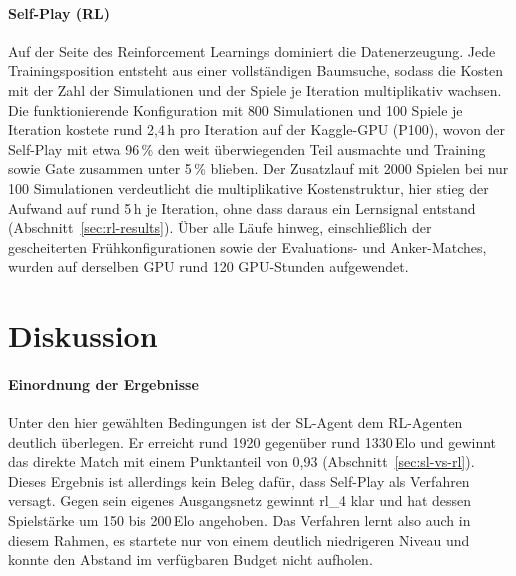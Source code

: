\documentclass[
  a4paper, 12pt,
  parskip=half,
  headings=small,
  bibliography=totoc
]{scrartcl}
\begin{document}
\paragraph{Self-Play (RL)}
Auf der Seite des Reinforcement Learnings dominiert die Datenerzeugung. Jede Trainingsposition entsteht aus einer vollständigen Baumsuche, sodass die Kosten mit der Zahl der Simulationen und der Spiele je Iteration multiplikativ wachsen.
Die funktionierende Konfiguration mit 800 Simulationen und 100 Spiele je Iteration kostete rund 2{,}4\,h pro Iteration auf der Kaggle-GPU (P100), wovon der Self-Play mit etwa 96\,\% den weit überwiegenden Teil ausmachte und Training sowie Gate zusammen unter 5\,\% blieben. 
Der Zusatzlauf mit 2000 Spielen bei nur 100 Simulationen verdeutlicht die multiplikative Kostenstruktur, hier stieg der Aufwand auf rund 5\,h je Iteration, ohne dass daraus ein Lernsignal entstand (Abschnitt~\ref{sec:rl-results}). Über alle Läufe hinweg, einschließlich der gescheiterten Frühkonfigurationen sowie der Evaluations- und Anker-Matches, wurden auf derselben GPU rund 120 GPU-Stunden aufgewendet.


\section{Diskussion}

\paragraph{Einordnung der Ergebnisse}
Unter den hier gewählten Bedingungen ist der SL-Agent dem RL-Agenten deutlich
überlegen. Er erreicht rund 1920 gegenüber rund
1330\,Elo und gewinnt das direkte Match mit einem Punktanteil von 0{,}93
(Abschnitt~\ref{sec:sl-vs-rl}). Dieses Ergebnis ist allerdings kein Beleg dafür,
dass Self-Play als Verfahren versagt. Gegen sein eigenes Ausgangsnetz gewinnt
rl\_4 klar und hat dessen Spielstärke um 150 bis 200\,Elo angehoben. Das Verfahren
lernt also auch in diesem Rahmen, es startete nur von einem deutlich niedrigeren
Niveau und konnte den Abstand im verfügbaren Budget nicht aufholen.
\end{document}
